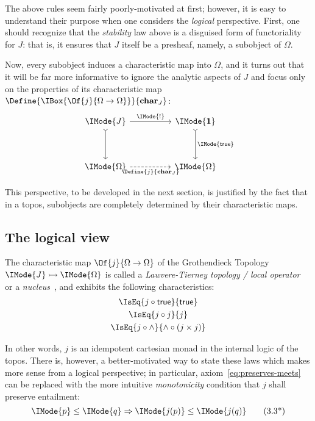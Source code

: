 \documentclass{article}
\newcommand\Char[1]{\mathbf{char}_{#1}}
\newcommand\One{\mathbf{1}}
\begin{document}
The above rules seem fairly poorly-motivated at first; however, it is
easy to understand their purpose when one considers the \emph{logical}
perspective. First, one should recognize that the \emph{stability} law
above is a disguised form of functoriality for $J$: that is, it
ensures that $J$ itself be a presheaf, namely, a subobject of
$\Omega$.

Now, every subobject induces a characteristic map into $\Omega$, and
it turns out that it will be far more informative to ignore the
analytic aspects of $J$ and focus only on the properties of its
characteristic map $\Define{\IBox{\Of{j}{\Omega\to\Omega}}}{\Char{J}}$:
\[
  \begin{tikzcd}[sep=huge]
    \IMode{J}
    \arrow[r,"\IMode{!}"]
    \arrow[d,rightarrowtail]
    &
    \IMode{\One}
    \arrow[d,rightarrowtail, "\IMode{\True}"]
    \\
    \IMode{\Omega}
    \arrow[r,swap,dashed,"\Define{j}{\Char{J}}"]
    &
    \IMode{\Omega}
  \end{tikzcd}
\]

This perspective, to be developed in the next section, is justified by
the fact that in a topos, subobjects are completely determined by
their characteristic maps.

\subsection{The logical view}
\newcommand\Entails[2]{\IMode{#1}\leq\IMode{#2}}

\begin{definition}\label{def:lawvere-tierney}
The characteristic map $\Of{j}{\Omega\to\Omega}$ of the Grothendieck
Topology $\Mono{\IMode{J}}{\IMode{\Omega}}$ is called a
\emph{Lawvere-Tierney topology / local
  operator}~\cite{maclane-moerdijk:1992} or a
\emph{nucleus}~\cite{jacobs:1999}, and exhibits the following
characteristics:
\begin{gather}
  \IsEq{j\circ\True}{\True}
  \label{eq:preserves-true}
  \\
  \IsEq{j\circ j}{j}
  \label{eq:idempotency}
  \\
  \IsEq{j\circ\land}{\land\circ(j\times j)}
  \label{eq:preserves-meets}
\end{gather}
\end{definition}

In other words, $j$ is an idempotent cartesian monad in the internal
logic of the topos. There is, however, a better-motivated way to state
these laws which makes more sense from a logical perspective; in
particular, axiom~\ref{eq:preserves-meets} can be replaced with the
more intuitive \emph{monotonicity} condition that $j$ shall preserve
entailment:
\begin{equation}
  \Entails{p}{q}\Rightarrow\Entails{j(p)}{j(q)}
  \tag{3.3*}
  \label{eq:monotonicity}
\end{equation}
\end{document}
